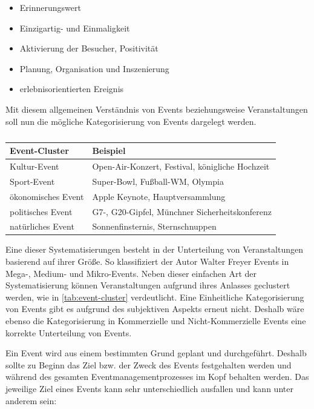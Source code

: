 \begin{itemize}
    \item Erinnerungswert
    \item Einzigartig- und Einmaligkeit
    \item Aktivierung der Besucher, Positivität
    \item Planung, Organisation und Inszenierung
    \item erlebnisorientierten Ereignis
\end{itemize}

Mit diesem allgemeinen Verständnis von Events beziehungsweise Veranstaltungen soll nun die mögliche Kategorisierung von Events dargelegt werden. 

\begin{table}[!h]
    \centering
    \begin{tabular}{l|l}
        \textbf{Event-Cluster}      & \textbf{Beispiel} \\ \hline
        Kultur-Event                & Open-Air-Konzert, Festival, königliche Hochzeit        \\ \hline
        Sport-Event                 & Super-Bowl, Fußball-WM, Olympia   \\ \hline
        ökonomisches Event          & Apple Keynote, Hauptversammlung   \\ \hline
        politisches Event           & G7-, G20-Gipfel, Münchner Sicherheitskonferenz                   \\ \hline
        natürliches Event           & Sonnenfinsternis, Sternschnuppen        
    \end{tabular}%
    \caption{}
    \label{tab:event-cluster}
\end{table}

Eine dieser Systematisierungen besteht in der Unterteilung von Veranstaltungen basierend auf ihrer Größe. So klassifiziert der Autor Walter Freyer Events in Mega-, Medium- und Mikro-Events. Neben dieser einfachen Art der Systematisierung können Veranstaltungen aufgrund ihres Anlasses geclustert werden, wie in \autoref{tab:event-cluster} verdeutlicht. Eine Einheitliche Kategorisierung von Events gibt es aufgrund des subjektiven Aspekts erneut nicht. Deshalb wäre ebenso die Kategorisierung in Kommerzielle und Nicht-Kommerzielle Events eine korrekte Unterteilung von Events.\autocite[Vgl.][S. 23 ff.]{Eisermann.2014}

Ein Event wird aus einem bestimmten Grund geplant und durchgeführt. Deshalb sollte zu Beginn das Ziel bzw. der Zweck des Events festgehalten werden und während des gesamten Eventmanagementprozesses im Kopf behalten werden. Das jeweilige Ziel eines Events kann sehr unterschiedlich ausfallen und kann unter anderem sein:

